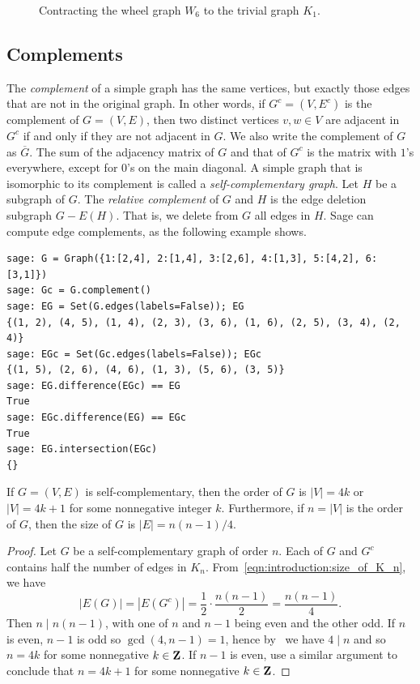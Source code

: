 \begin{figure}[!htbp]
\centering

\caption{Contracting the wheel graph $W_6$ to the trivial graph $K_1$.}
\label{fig:introduction:edge_contraction_W6_to_K1}
\end{figure}



\subsection{Complements}

The \emph{complement} of a simple graph has the same
vertices, but exactly those edges that are not in the original
graph. In other words, if $G^c = (V, E^c)$ is the
complement of $G = (V,E)$, then two distinct vertices $v,w \in V$ are
adjacent in $G^c$ if and only if they are not adjacent in $G$. We also
write the complement of $G$ as
$\overline{G}$. The sum of the adjacency matrix
of $G$ and that of $G^c$ is the matrix with $1$'s everywhere, except
for $0$'s on the main diagonal. A simple graph that is isomorphic to
its complement is called a
\emph{self-complementary graph}. Let
$H$ be a subgraph of $G$. The
\emph{relative complement} of $G$ and $H$
is the edge deletion subgraph $G - E(H)$. That is, we delete from $G$
all edges in $H$. Sage can compute edge complements, as the following
example shows.
\begin{lstlisting}
sage: G = Graph({1:[2,4], 2:[1,4], 3:[2,6], 4:[1,3], 5:[4,2], 6:[3,1]})
sage: Gc = G.complement()
sage: EG = Set(G.edges(labels=False)); EG
{(1, 2), (4, 5), (1, 4), (2, 3), (3, 6), (1, 6), (2, 5), (3, 4), (2, 4)}
sage: EGc = Set(Gc.edges(labels=False)); EGc
{(1, 5), (2, 6), (4, 6), (1, 3), (5, 6), (3, 5)}
sage: EG.difference(EGc) == EG
True
sage: EGc.difference(EG) == EGc
True
sage: EG.intersection(EGc)
{}
\end{lstlisting}

\begin{theorem}
If $G = (V, E)$ is self-complementary, then the order of $G$ is
$|V| = 4k$ or $|V| = 4k + 1$ for some nonnegative integer
$k$. Furthermore, if $n = |V|$ is the order of $G$, then the size of
$G$ is $|E| = n(n - 1) / 4$.
\end{theorem}

\begin{proof}
Let $G$ be a self-complementary graph of order $n$. Each of $G$ and
$G^c$ contains half the number of edges in
$K_n$. From~\eqref{eqn:introduction:size_of_K_n}, we have
\[
|E(G)|
=
|E(G^c)|
=
\frac{1}{2} \cdot \frac{n(n - 1)}{2}
=
\frac{n(n - 1)}{4}.
\]
Then $n \;|\; n(n - 1)$, with one of $n$ and $n - 1$ being even and
the other odd. If $n$ is even, $n - 1$ is odd so $\gcd(4, n-1) = 1$,
hence by~\cite[Theorem~1.9]{Shoup2008} we have $4 \;|\; n$ and so
$n = 4k$ for some nonnegative $k \in \mathbf{Z}$. If $n - 1$ is even, use a
similar argument to conclude that $n = 4k + 1$ for some nonnegative
$k \in \mathbf{Z}$.
\end{proof}

